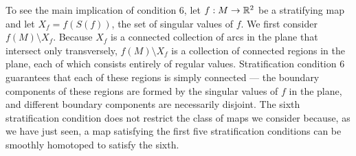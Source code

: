 
To see the main implication of condition 6, let $f:M\to\mathbb{R}^2$ be a stratifying map and let $X_f = f(S(f))$, the set of singular values of $f$.
We first consider $f(M)\setminus X_f$.
Because $X_f$ is a connected collection of arcs in the plane that intersect only transversely, $f(M)\setminus X_f$ is a collection of connected regions in the plane, each of which consists entirely of regular values.
Stratification condition 6 guarantees that each of these regions is simply connected --- the boundary components of these regions are formed by the singular values of $f$ in the plane, and different boundary components are necessarily disjoint.
The sixth stratification condition does not restrict the class of maps we consider because, as we have just seen, a map satisfying the first five stratification conditions can be smoothly homotoped to satisfy the sixth.


